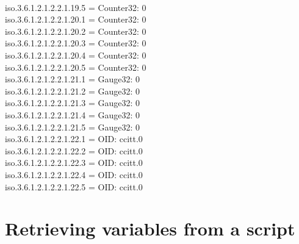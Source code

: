 \documentclass[a4paper,titlepage]{article}
\begin{document}
\begin{center}
{\\iso.3.6.1.2.1.2.2.1.19.5 = Counter32: 0
\\iso.3.6.1.2.1.2.2.1.20.1 = Counter32: 0
\\iso.3.6.1.2.1.2.2.1.20.2 = Counter32: 0
\\iso.3.6.1.2.1.2.2.1.20.3 = Counter32: 0
\\iso.3.6.1.2.1.2.2.1.20.4 = Counter32: 0
\\iso.3.6.1.2.1.2.2.1.20.5 = Counter32: 0
\\iso.3.6.1.2.1.2.2.1.21.1 = Gauge32: 0
\\iso.3.6.1.2.1.2.2.1.21.2 = Gauge32: 0
\\iso.3.6.1.2.1.2.2.1.21.3 = Gauge32: 0
\\iso.3.6.1.2.1.2.2.1.21.4 = Gauge32: 0
\\iso.3.6.1.2.1.2.2.1.21.5 = Gauge32: 0
\\iso.3.6.1.2.1.2.2.1.22.1 = OID: ccitt.0
\\iso.3.6.1.2.1.2.2.1.22.2 = OID: ccitt.0
\\iso.3.6.1.2.1.2.2.1.22.3 = OID: ccitt.0
\\iso.3.6.1.2.1.2.2.1.22.4 = OID: ccitt.0
\\iso.3.6.1.2.1.2.2.1.22.5 = OID: ccitt.0}
\end{center}

\section{Retrieving variables from a script}


\newpage
\end{document}
